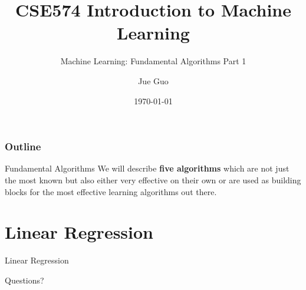 \documentclass[9pt,dvipsnames]{beamer}
\title{CSE574 Introduction to Machine Learning}
\subtitle{Machine Learning: Fundamental Algorithms Part 1}
\author{Jue Guo}
\institute{University at Buffalo}
\date{\today}
\begin{document}
\begin{frame}
    \titlepage
\end{frame}

\begin{frame}
    \frametitle{Outline}
    \tableofcontents
\end{frame}

\begin{frame}{Fundamental Algorithms}
    We will describe \textbf{five algorithms} which are not just the most known but also either very effective on their own or are used as building blocks for the most effective learning algorithms out there.
\end{frame}

\section{Linear Regression}
\begin{frame}{Linear Regression}
\end{frame}

\begin{frame}
    \begin{center}
        \Huge Questions?
    \end{center}
\end{frame}
\end{document}
